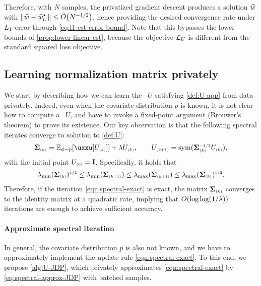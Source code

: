 Therefore, with $N$ samples, the privatized gradient descent produces a solution $\widehat{w}$ with $\left\|\widehat{w}-\widehat{w}^\star_U\right\|\leq \tilde{O}{\left( N^{-1/2} \right)}$, hence providing the desired convergence rate under $L_1$-error through \eqref{eq:l1-est-error-bound}.
Note that this bypasses the lower bounds of \cref{prop:lower-linear-est}, because the objective $\mathcal{L}_{U}$ is different from the standard squared loss objective. 


\subsection{Learning normalization matrix privately}\label{ssec:U-alg}

We start by describing how we can learn the \um~$U$ satisfying \eqref{def:U-app} from data privately. 
Indeed, even when the covariate distribution $p$ is known, it is not clear how to compute a \um~$U$, and \citet{chen2024private} have to invoke a fixed-point argument (Brouwer's theorem) to prove its existence. 
Our key observation is that the following spectral iterates converge to solution to \eqref{def:U}:
\begin{align}\label{eqn:spectral-exact}
    \cov\kk=\Ep{\uxxu[U\kk]}+\lambda U\kk, \qquad
    U\kp=\sym(\cov\kk\isq U\kk),
\end{align}
with the initial point $U_{\scriptscriptstyle{ (0) }}=\mathbf{I}$. Specifically, it holds that
\begin{align*}
    \lambda_{\min}(\boldsymbol{\Sigma}_{\scriptscriptstyle{ (k) }})^{{\scriptscriptstyle1/2}}\leq \lambda_{\min}(\boldsymbol{\Sigma}_{\scriptscriptstyle{ (k+1) }})\leq \lambda_{\max}(\boldsymbol{\Sigma}_{\scriptscriptstyle{ (k+1) }})\leq \lambda_{\max}(\boldsymbol{\Sigma}_{\scriptscriptstyle{ (k) }})^{{\scriptscriptstyle1/2}}.
\end{align*}
Therefore, if the iteration \cref{eqn:spectral-exact} is exact, the matrix $\boldsymbol{\Sigma}_{\scriptscriptstyle{ (k) }}$ converges to the identity matrix at a quadratic rate, implying that $O{\left( \log\log(1/\lambda) \right)}$ iterations are enough to achieve sufficient accuracy.

\paragraph{Approximate spectral iteration} 
In general, the covariate distribution $p$ is also not known, and we have to approximately implement the update rule \cref{eqn:spectral-exact}. To this end, we propose \cref{alg:U-JDP}, which privately approximates \eqref{eqn:spectral-exact} by \eqref{eq:spectral-approx-JDP} with batched samples.

